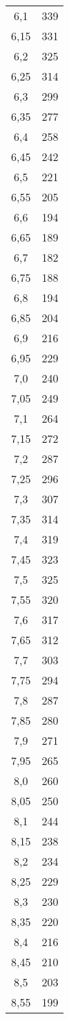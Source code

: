 \begin{longtable}{cc}
6,1  & 339\\
6,15 & 331\\
6,2  & 325\\
6,25 & 314\\
6,3  & 299\\
6,35 & 277\\
6,4  & 258\\
6,45 & 242\\
6,5  & 221\\
6,55 & 205\\
6,6  & 194\\
6,65 & 189\\
6,7  & 182\\
6,75 & 188\\
6,8  & 194\\
6,85 & 204\\
6,9  & 216\\
6,95 & 229\\
7,0  & 240\\
7,05 & 249\\
7,1  & 264\\
7,15 & 272\\
7,2  & 287\\
7,25 & 296\\
7,3  & 307\\
7,35 & 314\\
7,4  & 319\\
7,45 & 323\\
7,5  & 325\\
7,55 & 320\\
7,6  & 317\\
7,65 & 312\\
7,7  & 303\\
7,75 & 294\\
7,8  & 287\\
7,85 & 280\\
7,9  & 271\\
7,95 & 265\\
8,0  & 260\\
8,05 & 250\\
8,1  & 244\\
8,15 & 238\\
8,2  & 234\\
8,25 & 229\\
8,3  & 230\\
8,35 & 220\\
8,4  & 216\\
8,45 & 210\\
8,5  & 203\\
8,55 & 199\\

\end{longtable}
